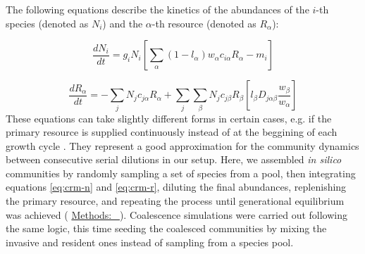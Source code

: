 \documentclass[a4paper,10pt]{article}
\newcommand{\methodsref}[1]{%
  \hyperref[{methods:#1}]{%
   Methods:~\nameref*{methods:#1}%
  }%
}
\begin{document}
\begin{mdframed}
The following equations describe the kinetics of the abundances
of the $i$-th species (denoted as $N_i$)
and the $\alpha$-th resource (denoted as $R_\alpha$):

\begin{equation}
\frac{dN_i}{dt} = 
g_i N_i
\left[
\sum_\alpha \left( 1-l_\alpha \right)
w_\alpha c_{i\alpha} R_\alpha
- m_i
\right]
\label{eq:crm-n}
\end{equation}

\begin{equation}
\frac{dR_\alpha}{dt} = 
- \sum_j N_j c_{j\alpha} R_\alpha
+ \sum_j \sum_\beta N_j c_{j\beta} R_\beta
\left[
l_\beta D_{j\alpha\beta} \frac{w_\beta}{w_\alpha}
\right]
\label{eq:crm-r}
\end{equation}
%
These equations can take slightly different forms in certain cases,
e.g. if the primary resource is supplied continuously instead of at the beggining
of each growth cycle \cite{Marsland2019,Marsland2020}.
They represent a good approximation for the community dynamics between consecutive
serial dilutions in our setup.
Here, we assembled \textit{in silico} communities by randomly
sampling a set of species from a pool,
then integrating equations \ref{eq:crm-n} and \ref{eq:crm-r},
diluting the final abundances,
replenishing the primary resource,
and repeating the process until generational equilibrium was achieved
(\methodsref{sim}).
Coalescence simulations were carried out following the same logic,
this time seeding the coalesced communities by mixing the invasive and resident
ones instead of sampling from a species pool.

\bigskip
\end{mdframed}

\clearpage
\end{document}
